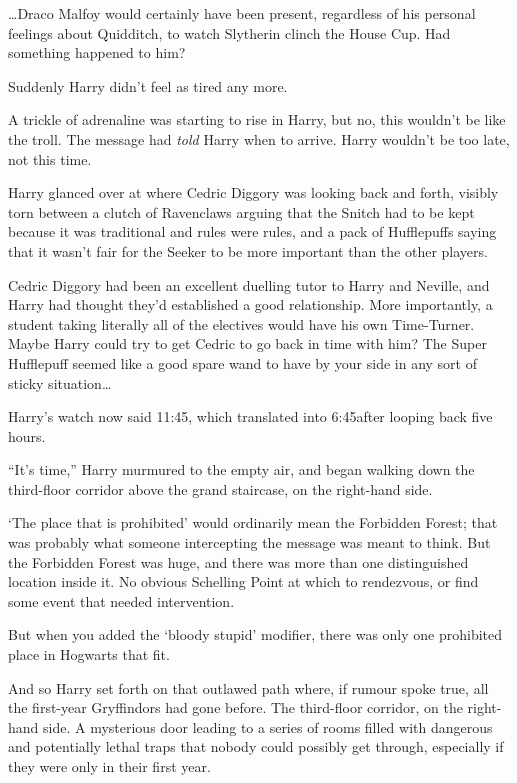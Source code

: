 …Draco Malfoy would certainly have been present, regardless of his personal feelings about Quidditch, to watch Slytherin clinch the House Cup. Had something happened to him?

Suddenly Harry didn’t feel as tired any more.

A trickle of adrenaline was starting to rise in Harry, but no, this wouldn’t be like the troll. The message had \emph{told} Harry when to arrive. Harry wouldn’t be too late, not this time.

Harry glanced over at where Cedric Diggory was looking back and forth, visibly torn between a clutch of Ravenclaws arguing that the Snitch had to be kept because it was traditional and rules were rules, and a pack of Hufflepuffs saying that it wasn’t fair for the Seeker to be more important than the other players.

Cedric Diggory had been an excellent duelling tutor to Harry and Neville, and Harry had thought they’d established a good relationship. More importantly, a student taking literally all of the electives would have his own Time-Turner. Maybe Harry could try to get Cedric to go back in time with him? The Super Hufflepuff seemed like a good spare wand to have by your side in any sort of sticky situation…


Harry’s watch now said 11:45, which translated into 6:45\pm after looping back five hours.

“It’s time,” Harry murmured to the empty air, and began walking down the third-floor corridor above the grand staircase, on the right-hand side.

‘The place that is prohibited’ would ordinarily mean the Forbidden Forest; that was probably what someone intercepting the message was meant to think. But the Forbidden Forest was huge, and there was more than one distinguished location inside it. No obvious Schelling Point at which to rendezvous, or find some event that needed intervention.

But when you added the ‘bloody stupid’ modifier, there was only one prohibited place in Hogwarts that fit.

And so Harry set forth on that outlawed path where, if rumour spoke true, all the first-year Gryffindors had gone before. The third-floor corridor, on the right-hand side. A mysterious door leading to a series of rooms filled with dangerous and potentially lethal traps that nobody could possibly get through, especially if they were only in their first year.

